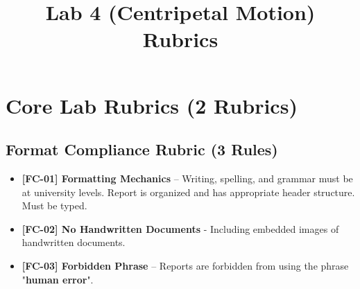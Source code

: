\documentclass{article}
\begin{document}
\pagestyle{empty}

\title{Lab 4 (Centripetal Motion) Rubrics}

\section*{Core Lab Rubrics (2 Rubrics)}

\subsection*{Format Compliance Rubric (3 Rules)}
\begin{itemize}
\item \textbf{ [FC-01] Formatting Mechanics } – Writing, spelling, and grammar must be at university levels. Report is organized and has appropriate header structure. Must be typed.
\item \textbf{ [FC-02] No Handwritten Documents } - Including embedded images of handwritten documents.
\item \textbf{ [FC-03] Forbidden Phrase } – Reports are forbidden from using the phrase "\textbf{human error}". 
\end{itemize}
\end{document}
